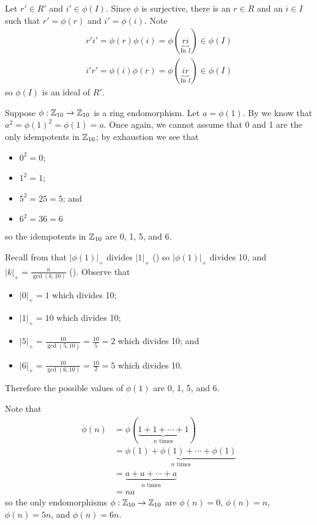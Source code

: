 \begin{questions}
\begin{partquestions}{\alph*}
        Let $r' \in R'$ and $i' \in \phi(I)$. Since $\phi$ is surjective, there is an $r \in R$ and an $i \in I$ such that $r' = \phi(r)$ and $i' = \phi(i)$. Note
        \begin{align*}
            r'i' = \phi(r)\phi(i) = \phi(\underbrace{ri}_{\text{In }I}) \in \phi(I)\\
            i'r' = \phi(i)\phi(r) = \phi(\underbrace{ir}_{\text{In }I}) \in \phi(I)
        \end{align*}
        so $\phi(I)$ is an ideal of $R'$.
    \end{partquestions}

    \item Suppose $\phi: \mathbb{Z}_{10}\to\mathbb{Z}_{10}$ is a ring endomorphism. Let $a = \phi(1)$. By  we know that $a^2 = \phi(1)^2 = \phi(1) = a$. Once again, we cannot assume that 0 and 1 are the only idempotents in $\mathbb{Z}_{10}$; by exhaustion we see that
    \begin{itemize}
        \item $0^2 = 0$;
        \item $1^2 = 1$;
        \item $5^2 = 25 = 5$; and
        \item $6^2 = 36 = 6$
    \end{itemize}
    so the idempotents in $\mathbb{Z}_{10}$ are 0, 1, 5, and 6.

    Recall from  that $|\phi(1)|_+$ divides $|1|_+$ () so $|\phi(1)|_+$ divides 10, and $|k|_+ = \frac{n}{\gcd(k,10)}$ (). Observe that
    \begin{itemize}
        \item $|0|_+ = 1$ which divides 10;
        \item $|1|_+ = 10$ which divides 10;
        \item $|5|_+ = \frac{10}{\gcd(5,10)} = \frac{10}{5} = 2$ which divides 10; and
        \item $|6|_+ = \frac{10}{\gcd(6,10)} = \frac{10}{2} = 5$ which divides 10.
    \end{itemize}
    Therefore the possible values of $\phi(1)$ are 0, 1, 5, and 6.

    Note that
    \begin{align*}
        \phi(n) &= \phi(\underbrace{1+1+\cdots+1}_{n \text{ times}})\\
        &= \underbrace{\phi(1)+\phi(1)+\cdots+\phi(1)}_{n \text{ times}}\\
        &= \underbrace{a + a + \cdots + a}_{n \text{ times}}\\
        &= na
    \end{align*}
    so the only endomorphisms $\phi: \mathbb{Z}_{10} \to \mathbb{Z}_{10}$ are $\phi(n) = 0$, $\phi(n) = n$, $\phi(n) = 5n$, and $\phi(n) = 6n$.


\end{questions}
